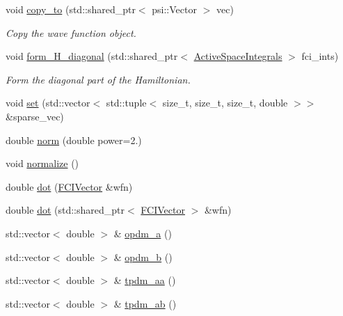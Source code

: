 \begin{DoxyCompactItemize}
void \mbox{\hyperlink{classforte_1_1_f_c_i_vector_af77aa0955826ad3c3588ee4f9a93bad9}{copy\+\_\+to}} (std\+::shared\+\_\+ptr$<$ psi\+::\+Vector $>$ vec)
\begin{DoxyCompactList}\small\item\em Copy the wave function object. \end{DoxyCompactList}\item 
void \mbox{\hyperlink{classforte_1_1_f_c_i_vector_afdfc26aaf2b21ea6b5cfdec40c71cf22}{form\+\_\+\+H\+\_\+diagonal}} (std\+::shared\+\_\+ptr$<$ \mbox{\hyperlink{classforte_1_1_active_space_integrals}{Active\+Space\+Integrals}} $>$ fci\+\_\+ints)
\begin{DoxyCompactList}\small\item\em Form the diagonal part of the Hamiltonian. \end{DoxyCompactList}\item 
void \mbox{\hyperlink{classforte_1_1_f_c_i_vector_abe8cd93a76079285466cddff46961760}{set}} (std\+::vector$<$ std\+::tuple$<$ size\+\_\+t, size\+\_\+t, size\+\_\+t, double $>$$>$ \&sparse\+\_\+vec)
\item 
double \mbox{\hyperlink{classforte_1_1_f_c_i_vector_aa3a4006628555ede48afd56c284c911a}{norm}} (double power=2.)
\item 
void \mbox{\hyperlink{classforte_1_1_f_c_i_vector_ad477a8c333a440f3b5f59e980f443484}{normalize}} ()
\item 
double \mbox{\hyperlink{classforte_1_1_f_c_i_vector_a1cccfb3c677d313ba9bb278adc5d8dba}{dot}} (\mbox{\hyperlink{classforte_1_1_f_c_i_vector}{F\+C\+I\+Vector}} \&wfn)
\item 
double \mbox{\hyperlink{classforte_1_1_f_c_i_vector_a5a80e78715a46d5edf2771e225dc8bcc}{dot}} (std\+::shared\+\_\+ptr$<$ \mbox{\hyperlink{classforte_1_1_f_c_i_vector}{F\+C\+I\+Vector}} $>$ \&wfn)
\item 
std\+::vector$<$ double $>$ \& \mbox{\hyperlink{classforte_1_1_f_c_i_vector_a6d0c2dafcf9e13600685db7f7a27cae6}{opdm\+\_\+a}} ()
\item 
std\+::vector$<$ double $>$ \& \mbox{\hyperlink{classforte_1_1_f_c_i_vector_a345012bafb002400635091f98018589d}{opdm\+\_\+b}} ()
\item 
std\+::vector$<$ double $>$ \& \mbox{\hyperlink{classforte_1_1_f_c_i_vector_ab85a2b7900a540e1c8ba6f7cd4447ab6}{tpdm\+\_\+aa}} ()
\item 
std\+::vector$<$ double $>$ \& \mbox{\hyperlink{classforte_1_1_f_c_i_vector_a4a953a96657455eedcd54749dea82d08}{tpdm\+\_\+ab}} ()
\item 
$$
\end{DoxyCompactItemize}
